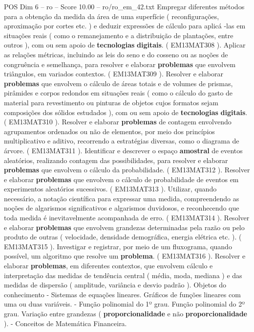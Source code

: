 \begin{textsample}{POS Dim 6 – ro – Score 10.00 – ro/ro\_em\_42.txt}
Empregar diferentes métodos para a obtenção da medida da área de uma superfície ( reconfigurações, aproximação por cortes etc. ) e deduzir expressões de cálculo para aplicá -las em situações reais ( como o remanejamento e a distribuição de plantações, entre outros ), com ou sem apoio de \textbf{tecnologias} \textbf{digitais}. ( EM13MAT308 ).
Aplicar as relações métricas, incluindo as leis do seno e do cosseno ou as noções de congruência e semelhança, para resolver e elaborar \textbf{problemas} que envolvem triângulos, em variados contextos. ( EM13MAT309 ).
Resolver e elaborar \textbf{problemas} que envolvem o cálculo de áreas totais e de volumes de prismas, pirâmides e corpos redondos em situações reais ( como o cálculo do gasto de material para revestimento ou pinturas de objetos cujos formatos sejam composições dos sólidos estudados ), com ou sem apoio de \textbf{tecnologias} \textbf{digitais}. ( EM13MAT310 ).
Resolver e elaborar \textbf{problemas} de contagem envolvendo agrupamentos ordenados ou não de elementos, por meio dos princípios multiplicativo e aditivo, recorrendo a estratégias diversas, como o diagrama de árvore. ( EM13MAT311 ).
Identificar e descrever o espaço \textbf{amostral} de eventos aleatórios, realizando contagem das possibilidades, para resolver e elaborar \textbf{problemas} que envolvem o cálculo da probabilidade. ( EM13MAT312 ).
Resolver e elaborar \textbf{problemas} que envolvem o cálculo de probabilidade de eventos em experimentos aleatórios sucessivos. ( EM13MAT313 ).
Utilizar, quando necessário, a notação científica para expressar uma medida, compreendendo as noções de algarismos significativos e algarismos duvidosos, e reconhecendo que toda medida é inevitavelmente acompanhada de erro. ( EM13MAT314 ).
Resolver e elaborar \textbf{problemas} que envolvem grandezas determinadas pela razão ou pelo produto de outras ( velocidade, densidade demográfica, energia elétrica etc. ). ( EM13MAT315 ).
Investigar e registrar, por meio de um fluxograma, quando possível, um algoritmo que resolve um \textbf{problema}. ( EM13MAT316 ).
Resolver e elaborar \textbf{problemas}, em diferentes contextos, que envolvem cálculo e interpretação das medidas de tendência central ( média, moda, mediana ) e das medidas de dispersão ( amplitude, variância e desvio padrão ).
Objetos do conhecimento - Sistemas de equações lineares.
Gráficos de funções lineares com uma ou duas variáveis. - Função polinomial do 1º grau.
Função polinomial do 2º grau.
Variação entre grandezas ( \textbf{proporcionalidade} e não \textbf{proporcionalidade} ). - Conceitos de Matemática Financeira.

\end{textsample}
